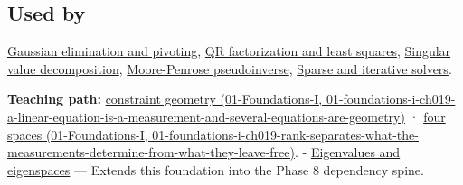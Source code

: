 \subsection{Used by}\label{appendix-8572a4a060c1-used-by}

\hyperref[appendix-f6e77f4a200f]{Gaussian elimination and pivoting}, \hyperref[appendix-c3421e6b4f2c]{QR factorization and least squares}, \hyperref[appendix-1fad5e7f36fa]{Singular value decomposition}, \hyperref[appendix-541306fdbc1b]{Moore-Penrose pseudoinverse}, \hyperref[appendix-67c87a3d9e94]{Sparse and iterative solvers}.

\textbf{Teaching path:} \href{../01-Foundations-I/main.pdf\#nameddest=01-foundations-i-ch019-a-linear-equation-is-a-measurement-and-several-equations-are-geometry}{constraint geometry (01-Foundations-I, 01-foundations-i-ch019-a-linear-equation-is-a-measurement-and-several-equations-are-geometry)} · \href{../01-Foundations-I/main.pdf\#nameddest=01-foundations-i-ch019-rank-separates-what-the-measurements-determine-from-what-they-leave-free}{four spaces (01-Foundations-I, 01-foundations-i-ch019-rank-separates-what-the-measurements-determine-from-what-they-leave-free)}. - \hyperref[appendix-0b3be18411f9]{Eigenvalues and eigenspaces} --- Extends this foundation into the Phase 8 dependency spine.
